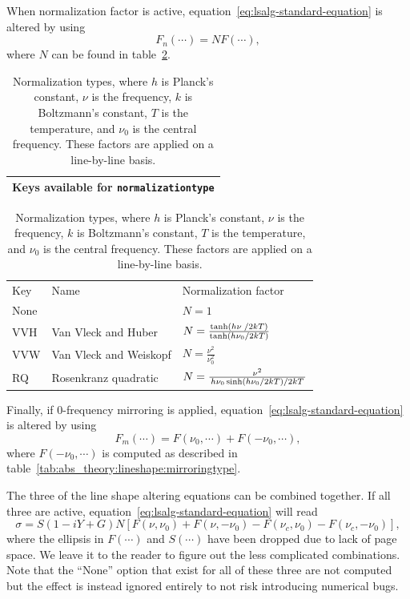 When normalization factor is active, equation~\ref{eq:lsalg-standard-equation} is altered by using
\begin{equation}
 F_n(\cdots) = N F(\cdots),
\end{equation}
where $N$ can be found in table~\ref{tab:abs_theory:lineshape:normalizationtype}.

\begin{table}[ht!]
 \centering
 \begin{tabular}{c}
  Keys available for \verb|normalizationtype|\\\hline
 \end{tabular}
 \begin{tabular}{lll}
  Key&Name&Normalization factor\\
  None&&$N=1$\\[5pt]
  VVH&Van Vleck and Huber& $N = \frac{\tanh \left( h\nu \; \middle/ 2kT \right)}{\tanh \left( h\nu_0 \middle/ 2kT \right)} $ \\[5pt]
  VVW&Van Vleck and Weiskopf&$N = \frac{\nu^2}{\nu^2_0}$\\[5pt]
  RQ&Rosenkranz quadratic& $N = \frac{\nu^2 }{\left. h\nu_0 \sinh\left( h\nu_0 \middle/ 2kT \right) \middle/ 2kT \right.} $
 \end{tabular}
 \caption{Normalization types, where $h$ is Planck's constant, $\nu$ is the frequency, $k$ is Boltzmann's constant,
 $T$ is the temperature, and $\nu_0$ is the central frequency.  These factors are applied on a line-by-line basis.}
 \label{tab:abs_theory:lineshape:normalizationtype}
\end{table}

Finally, if 0-frequency mirroring is applied, equation~\ref{eq:lsalg-standard-equation}
is altered by using
\begin{equation}
 F_m(\cdots)= F(\nu_0, \cdots) + F(-\nu_0, \cdots),
\end{equation}
where $F(-\nu_0, \cdots)$ is computed as described in table~\ref{tab:abs_theory:lineshape:mirroringtype}.

The three of the line shape altering equations can be combined together.  If all three are active,
equation~\ref{eq:lsalg-standard-equation} will read
\begin{equation}
 \sigma = S \left(1 - iY + G\right) N \left[F\left(\nu, \nu_0 \right) + F\left(\nu, -\nu_0 \right) - F\left(\nu_c, \nu_0 \right)  - F\left(\nu_c, -\nu_0 \right) \right],
\end{equation}
where the ellipsis in $F(\cdots)$ and $S(\cdots)$ have been dropped due to lack of page space.
We leave it to the reader to figure out the less complicated combinations.
Note that the ``None'' option that exist for all of these three are not computed but
the effect is instead ignored entirely to not risk introducing numerical bugs.


